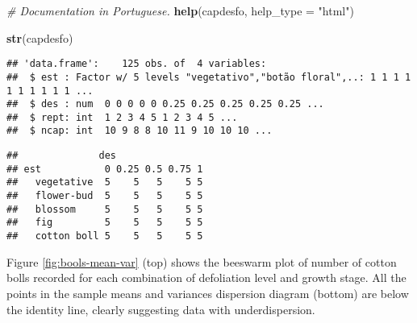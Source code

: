 \documentclass[9pt,a5paper,]{book}
\newenvironment{Shaded}{}{}
\newcommand{\KeywordTok}[1]{\textbf{{#1}}}
\newcommand{\DataTypeTok}[1]{\underline{{#1}}}
\newcommand{\StringTok}[1]{{#1}}
\newcommand{\CommentTok}[1]{\textit{{#1}}}
\newcommand{\NormalTok}[1]{{#1}}
\renewenvironment{Shaded}{\color{inputcolor}}{}
\renewcommand{\DataTypeTok}[1]{{#1}}
\theoremstyle{definition}
\theoremstyle{definition}
\theoremstyle{remark}
\begin{document}
\begin{Shaded}
\begin{Highlighting}[]
\CommentTok{# Documentation in Portuguese.}
\KeywordTok{help}\NormalTok{(capdesfo, }\DataTypeTok{help_type =} \StringTok{"html"}\NormalTok{)}
\end{Highlighting}
\end{Shaded}

\begin{Shaded}
\begin{Highlighting}[]
\KeywordTok{str}\NormalTok{(capdesfo)}
\end{Highlighting}
\end{Shaded}

\begin{verbatim}
## 'data.frame':    125 obs. of  4 variables:
##  $ est : Factor w/ 5 levels "vegetativo","botão floral",..: 1 1 1 1 1 1 1 1 1 1 ...
##  $ des : num  0 0 0 0 0 0.25 0.25 0.25 0.25 0.25 ...
##  $ rept: int  1 2 3 4 5 1 2 3 4 5 ...
##  $ ncap: int  10 9 8 8 10 11 9 10 10 10 ...
\end{verbatim}

\begin{Shaded}
\end{Shaded}

\begin{verbatim}
##              des
## est           0 0.25 0.5 0.75 1
##   vegetative  5    5   5    5 5
##   flower-bud  5    5   5    5 5
##   blossom     5    5   5    5 5
##   fig         5    5   5    5 5
##   cotton boll 5    5   5    5 5
\end{verbatim}

Figure \ref{fig:bools-mean-var} (top) shows the beeswarm plot of number
of cotton bolls recorded for each combination of defoliation level and
growth stage. All the points in the sample means and variances
dispersion diagram (bottom) are below the identity line, clearly
suggesting data with underdispersion.
\end{document}
